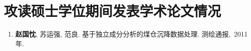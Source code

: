 
%
%

\chapter*{\hfill 攻读硕士学位期间发表学术论文情况 \hfill}
\renewcommand{\labelenumi}{[\arabic{enumi}]}
\begin{enumerate}

\item {\song\bf 赵国忱}, 苏运强, 范良. 基于独立成分分析的煤仓沉降数据处理. 测绘通报,~2011年.

\end{enumerate} 

